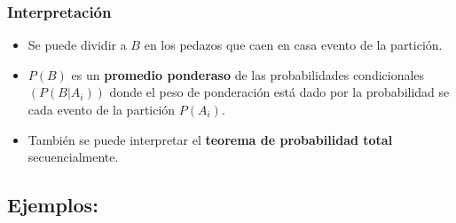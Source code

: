 \documentclass[a4paper]{book}
\begin{document}
\subsubsection{Interpretación}
\label{ssec:interpretacion}

\begin{itemize}
    \item Se puede dividir a \(B\) en los pedazos que caen en casa evento de la
        partición.
    \item \(P\left(B \right) \) es un \textbf{promedio ponderaso} de las
        probabilidades condicionales \(\left( P\left( B|A_{i} \right)  \right)
        \) donde el peso de ponderación está dado por la probabilidad se cada
        evento de la partición \(P\left( A_{i} \right) \).
    \item También se puede interpretar el \textbf{teorema de probabilidad
        total} secuencialmente.
\end{itemize}

\subsection{Ejemplos:}
\label{ssec:ejemplos}
\end{document}
